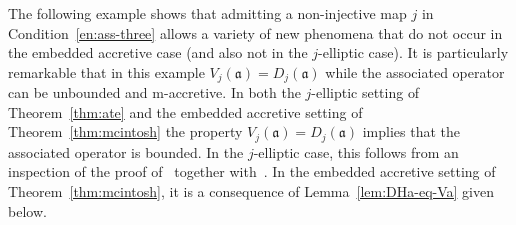 \documentclass[a4paper,oneside,12pt]{amsart}
\theoremstyle{plain}
\theoremstyle{definition}
\begin{document}
The following example shows that admitting a non-injective map $j$ in Condition~\ref{en:ass-three} 
allows a variety of new phenomena that do not occur
in the embedded accretive case (and also not in the $j$-elliptic case).
It is particularly remarkable that in this example $V_j({{\mathfrak{{a}}}})=D_j({{\mathfrak{{a}}}})$ while
the associated operator can be unbounded and {\ensuremath{\text{m}}}-accretive.
In both the $j$-elliptic setting of Theorem~\ref{thm:ate} and the embedded accretive 
setting of Theorem~\ref{thm:mcintosh} the property $V_j({{\mathfrak{{a}}}})=D_j({{\mathfrak{{a}}}})$ implies that
the associated operator is bounded.
In the $j$-elliptic case, this follows from an inspection of the proof of~\cite[Theorem~VI.2.1\,(ii)]{Kat1}
together with~\cite[Theorem~2.5\,(ii)]{AtE12:sect-form}.
In the embedded accretive setting of Theorem~\ref{thm:mcintosh},
it is a consequence of Lemma~\ref{lem:DHa-eq-Va} given below. 
\end{document}
